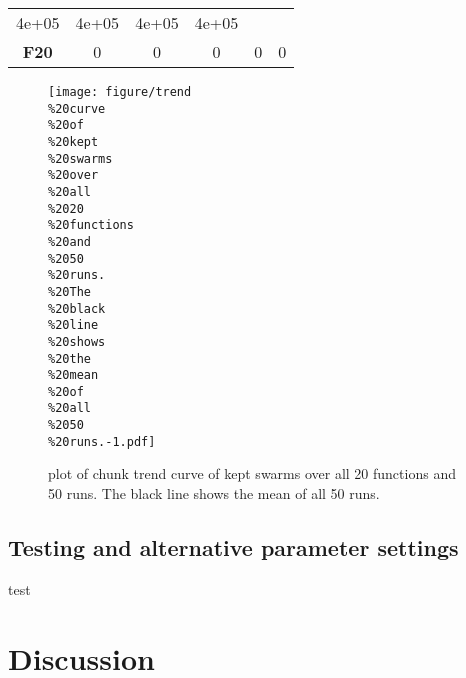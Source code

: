 \documentclass[12pt,a4paper]{article}
\begin{document}
\begin{longtable}[c]{@{}cccccc@{}}
\begin{minipage}[t]{0.08\columnwidth}
4e+05
\strut\end{minipage} &
\begin{minipage}[t]{0.09\columnwidth}\centering\strut
4e+05
\strut\end{minipage} &
\begin{minipage}[t]{0.10\columnwidth}\centering\strut
4e+05
\strut\end{minipage} &
\begin{minipage}[t]{0.10\columnwidth}\centering\strut
4e+05
\strut\end{minipage}\tabularnewline
\begin{minipage}[t]{0.12\columnwidth}\centering\strut
\textbf{F20}
\strut\end{minipage} &
\begin{minipage}[t]{0.08\columnwidth}\centering\strut
0
\strut\end{minipage} &
\begin{minipage}[t]{0.08\columnwidth}\centering\strut
0
\strut\end{minipage} &
\begin{minipage}[t]{0.09\columnwidth}\centering\strut
0
\strut\end{minipage} &
\begin{minipage}[t]{0.10\columnwidth}\centering\strut
0
\strut\end{minipage} &
\begin{minipage}[t]{0.10\columnwidth}\centering\strut
0
\strut\end{minipage}\tabularnewline
\bottomrule
\end{longtable}

\begin{figure}[htbp]
\centering
\texttt{[image: figure/trend\\\%20curve\\\%20of\\\%20kept\\\%20swarms\\\%20over\\\%20all\\\%2020\\\%20functions\\\%20and\\\%2050\\\%20runs.\\\%20The\\\%20black\\\%20line\\\%20shows\\\%20the\\\%20mean\\\%20of\\\%20all\\\%2050\\\%20runs.-1.pdf]}
\caption{plot of chunk trend curve of kept swarms over all 20 functions
and 50 runs. The black line shows the mean of all 50 runs.}
\end{figure}

\subsection{Testing and alternative parameter
settings}\label{testing-and-alternative-parameter-settings}

test

\section{Discussion}\label{discussion}
\end{document}
